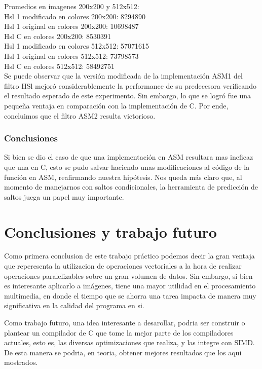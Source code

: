 \documentclass[a4paper]{article}
\begin{document}
Promedios en imagenes 200x200 y 512x512:
\\

Hsl 1 modificado en colores 200x200: 8294890
\\

Hsl 1 original en colores 200x200:  10698487
\\

Hsl C en colores 200x200: 8530391
\\

Hsl 1 modificado en colores 512x512: 57071615
\\

Hsl 1 original en colores 512x512: 73798573
\\

Hsl C en colores 512x512: 58492751
\\

Se puede observar que la versión modificada de la implementación ASM1 del filtro HSl mejoró considerablemente la performance de su predecesora verificando el resultado esperado de este experimento. Sin embargo, lo que se logró fue una pequeña ventaja en comparación con la implementación de C. Por ende, concluimos que el filtro ASM2 resulta victorioso.

\subsubsection{Conclusiones}

Si bien se dio el caso de que una implementación en ASM resultara mas ineficaz que una en C, esto se pudo salvar haciendo unas modificaciones al código de la función en ASM, reafirmando nuestra hipótesis. Nos queda más claro que, al momento de manejarnos con saltos condicionales, la herramienta de predicción de saltos juega un papel muy importante.

\newpage
\section{Conclusiones y trabajo futuro}
Como primera conclusion de este trabajo práctico podemos decir la gran ventaja que reperesenta la utilizacion de operaciones vectoriales a la hora de realizar operaciones paralelizables sobre un gran volumen de datos. Sin embargo, si bien es interesante aplicarlo a imágenes, tiene una mayor utilidad en el procesamiento multimedia, en donde el tiempo que se ahorra una tarea impacta de manera muy significativa en la calidad del programa en si.

Como trabajo futuro, una idea interesante a desarollar, podria ser construir o plantear un compilador de C que tome la mejor parte de los compiladores actuales, esto es, las diversas optimizaciones que
realiza, y las integre con SIMD. De esta manera se podria, en teoria, obtener mejores resultados que los aqui mostrados.
\end{document}

